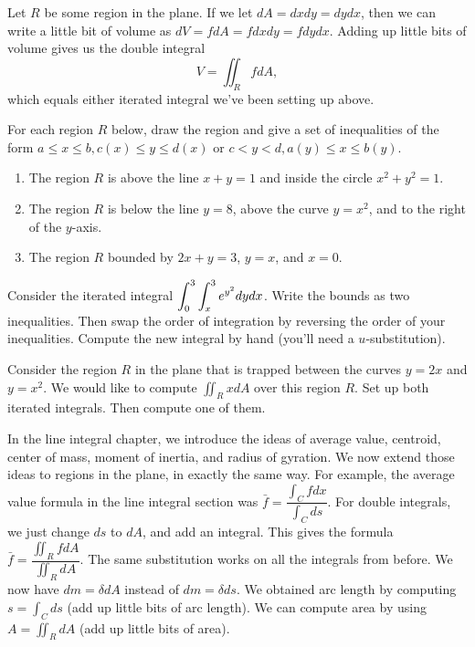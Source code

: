 
Let $R$ be some region in the plane.  If we let $dA=dxdy=dydx$, then we can write a little bit of volume as $dV=fdA=fdxdy=fdydx.$ Adding up little bits of volume gives us the double integral 
$$V = \iint_R fdA,$$
which equals either iterated integral we've been setting up above. 

\begin{problem}
For each region $R$ below, draw the region and give a set of inequalities of the form $a\leq x\leq b, c(x)\leq y\leq d(x)$ or $c<y<d, a(y)\leq x\leq b(y)$. 
\begin{enumerate}
 \item The region $R$ is above the line $x+y=1$ and inside the circle $x^2+y^2=1$.
 \item The region $R$ is below the line $y=8$, above the curve $y=x^2$, and to the right of the $y$-axis.
 \item The region $R$ bounded by $2x+y=3$, $y=x$, and $x=0$. 
\end{enumerate}
\end{problem}


\begin{problem}
Consider the iterated integral $\displaystyle \int_0^3\int_x^3 e^{y^2}dydx$. Write the bounds as two inequalities.  Then swap the order of integration by reversing the order of your inequalities.  Compute the new integral by hand (you'll need a $u$-substitution).
\end{problem}

\begin{problem}
Consider the region $R$ in the plane that is trapped between the curves $y=2x$ and $y=x^2$.  We would like to compute $\iint_R x dA$ over this region $R$.  Set up both iterated integrals. Then compute one of them.
\end{problem}




In the line integral chapter, we introduce the ideas of average value, centroid, center of mass, moment of inertia, and radius of gyration.  We now extend those ideas to regions in the plane, in exactly the same way.  For example, the average value formula in the line integral section was $\bar f = \dfrac{\int_C fdx}{\int_C ds}$. For double integrals, we just change $ds$ to $dA$, and add an integral.  This gives the formula $\bar f = \dfrac{\iint_R fdA}{\iint_R dA}.$ The same substitution works on all the integrals from before.  We now have $dm = \delta dA$ instead of $dm=\delta ds$. We obtained arc length by computing $s=\int_C ds$ (add up little bits of arc length).  We can compute area by using $A=\iint_R dA$ (add up little bits of area). 

